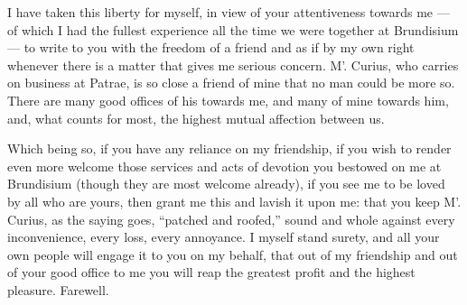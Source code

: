 

 I have taken this liberty for myself, in view of your attentiveness towards me --- of which I had the fullest experience all the time we were together at Brundisium --- to write to you with the freedom of a friend and as if by my own right whenever there is a matter that gives me serious concern. M'. Curius, who carries on business at Patrae, is so close a friend of mine that no man could be more so. There are many good offices of his towards me, and many of mine towards him, and, what counts for most, the highest mutual affection between us.

 Which being so, if you have any reliance on my friendship, if you wish to render even more welcome those services and acts of devotion you bestowed on me at Brundisium (though they are most welcome already), if you see me to be loved by all who are yours, then grant me this and lavish it upon me: that you keep M'. Curius, as the saying goes, ``patched and roofed,'' sound and whole against every inconvenience, every loss, every annoyance. I myself stand surety, and all your own people will engage it to you on my behalf, that out of my friendship and out of your good office to me you will reap the greatest profit and the highest pleasure. Farewell.
